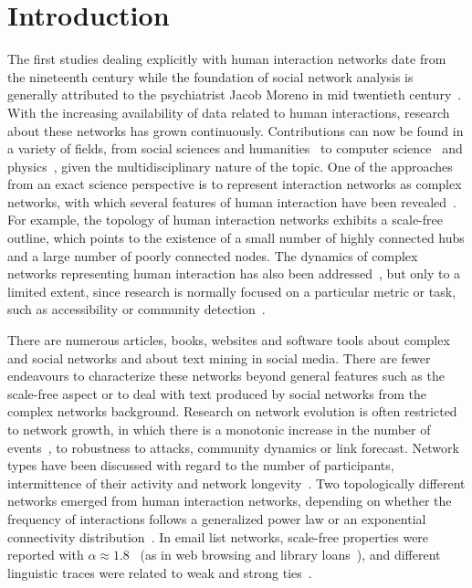 \chapter{Introduction}\label{ch:int}
The first studies dealing explicitly with human interaction networks
date from the nineteenth century while the foundation of
social network analysis is generally attributed to the psychiatrist Jacob Moreno in mid twentieth century~\cite{moreno,newmanBook}.
With the increasing availability of data related to human interactions, research about these networks has grown continuously.
Contributions can now be found in a variety of fields, from social sciences and humanities~\cite{latour2013} to computer science~\cite{bird} and physics~\cite{barabasiHumanDyn,newmanFriendship}, given the multidisciplinary nature of the topic.
One of the approaches from an exact science perspective is to represent interaction networks as complex networks, with which 
several features of human interaction have been revealed~\cite{barabasiHumanDyn,newmanFriendship}.
For example, the topology of human interaction networks exhibits a scale-free outline,
which points to the existence of a small number of highly connected hubs and a large number of poorly connected nodes.
The dynamics of complex networks representing human interaction has also been addressed~\cite{barabasiEvo,newmanEvolving}, but only to a limited extent, since research is normally focused on a particular metric or task, such as accessibility or community detection~\cite{access,newmanModularity}. 

There are numerous articles, books, websites and software tools about complex and social networks and about text mining in social media.
There are fewer endeavours to characterize these networks beyond general features such as the scale-free 
aspect or to deal with text produced by social networks from the complex networks background.
Research on network evolution is often restricted to network growth, in which there is a monotonic increase in the number of events~\cite{barabasiEvo}, to robustness to attacks, community dynamics or link forecast.
Network types have been discussed with regard to the number of participants, intermittence of their activity and network longevity~\cite{barabasiEvo}. Two topologically different networks emerged from human interaction networks, depending on whether the frequency of interactions follows a generalized power law or an exponential connectivity distribution~\cite{barabasiTopologicalEv}. In email list networks, scale-free properties were reported with $\alpha \approx 1.8$~\cite{bird} (as in web browsing and library loans~\cite{barabasiHumanDyn}), and different linguistic traces were related to weak and strong ties~\cite{Gmane2}.

